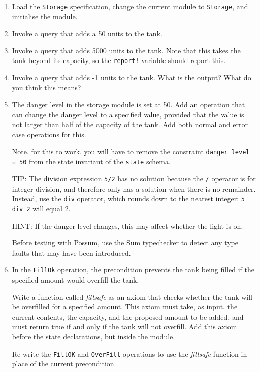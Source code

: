 \documentclass{article}
\begin{document}
\begin{enumerate}

 \item Load the \texttt{Storage} specification, change the current module to \texttt{Storage}, and initialise the module.

 \item Invoke a query that adds a 50 units to the tank.

 \item Invoke a query that adds 5000 units to the tank. Note that this takes  the tank beyond its capacity, so the \texttt{report!} variable should report this.

 \item Invoke a query that adds -1 units to the tank. What is the output? What do you think this means?

 \item The danger level in the storage module is set at 50. Add an operation that can change the danger level to a specified value, provided that the value is not larger than half of the capacity of the tank. Add both normal and error case operations for this.

  Note, for this to work, you will have to remove the constraint \texttt{danger\_level = 50} from the state invariant of the \texttt{state} schema.

  TIP: The division expression \texttt{5/2} has no solution because the \texttt{/} operator is for integer division, and therefore only has a solution when there is no remainder. Instead, use the \texttt{div} operator, which rounds down to the nearest integer: \texttt{5 div 2} will equal 2.

  HINT: If the danger level changes, this may affect whether the light is on.

  Before testing with Possum, use the Sum typechecker to detect any type faults that may have been introduced.

 \item In the \texttt{FillOk} operation, the precondition prevents the tank being filled if the specified amount would overfill the tank.

  Write a function called \emph{fillsafe} as an axiom that checks whether the tank will be overfilled for a specified amount. This axiom must take, as input, the current contents, the capacity, and the proposed amount to be added, and must return true if and only if the tank will not overfill. Add this axiom before the state declarations, but inside the module.
 
 Re-write the \texttt{FillOK} and \texttt{OverFill} operations to use the \emph{fillsafe} function in place of the current precondition.

\end{enumerate}
\end{document}
